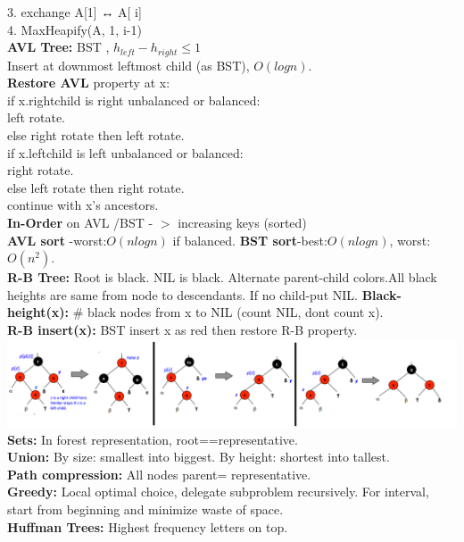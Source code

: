 \documentclass[paper=a4, fontsize=11pt]{scrartcl} %
\begin{document}
3. \indent exchange A[1] ↔ A[ i]\\
4. \indent MaxHeapify(A, 1, i-1)\\
\textbf{AVL Tree: }BST , $h_{left} - h_{right} \leq 1$\\
Insert at downmost leftmost child (as BST), $O(log n)$.\\
\textbf{Restore AVL }property at x: \\
if x.rightchild is right unbalanced or balanced: \\
\indent left rotate. \\
\indent else right rotate then left rotate.\\
if x.leftchild is left unbalanced or balanced: \\
\indent right rotate. \\
\indent else left rotate then right rotate.\\
continue with x's ancestors.\\
\textbf{In-Order} on AVL /BST - $>$ increasing keys (sorted)\\
\textbf{AVL sort} -worst:$O(nlogn)$ if balanced. \textbf{BST sort}-best:$O(nlogn)$, worst:$O(n^2)$.\\
\textbf{R-B Tree:} Root is black. NIL is black. Alternate parent-child colors.All black heights are same from node to descendants. If no child-put NIL. \textbf{Black-height(x):} \# black nodes from x to NIL (count NIL, dont count x).\\
\textbf{R-B insert(x): } BST insert x as red then restore R-B property.\\
\includegraphics[scale=0.6]{RB-fix.png}\\
\textbf{Sets: }In forest representation, root==representative.\\
\textbf{Union: }By size: smallest into biggest. By height: shortest into tallest.\\
\textbf{Path compression: }All nodes parent= representative.\\
\textbf{Greedy: } Local optimal choice, delegate subproblem recursively. For interval, start from beginning and minimize waste of space.\\
\textbf{Huffman Trees: } Highest frequency letters on top.\\
\end{document}
